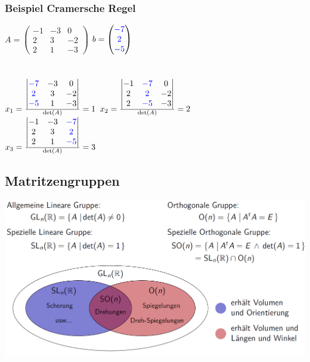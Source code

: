 			\vfill\null
			\columnbreak
			
			
			
			
			\subsubsection{Beispiel Cramersche Regel}
			$A = \begin{pmatrix}
				-1 & -3 & 0 \\
				2 & 3 & -2 \\
				2 & 1 & -3
				\end{pmatrix}$ \qquad $b = \begin{pmatrix}											\color{blue}-7 \\ \color{blue}2 \\ \color{blue}-5	
											\end{pmatrix}$ \\
				\\		
				\\ $x_1 = \frac{\begin{vmatrix}
							\color{blue}-7 & -3 & 0 \\
							\color{blue}2 & 3 & -2 \\
							\color{blue}-5 & 1 & -3 \\
							\end{vmatrix}}{\det(A)} = 1$ \qquad  $x_2 = \frac{\begin{vmatrix}
							-1 & \color{blue}-7 & 0 \\
							2 & \color{blue}2 & -2 \\
							2 & \color{blue}-5 & -3 \\
							\end{vmatrix}}{\det(A)} = 2$ \\
							
							\vspace{0.2cm}
				$x_3 = \frac{\begin{vmatrix}
							-1 & -3 & \color{blue}-7 \\
							2 & 3 & \color{blue}2 \\
							2 & 1 & \color{blue}-5 \\
							\end{vmatrix}}{\det(A)} = 3$ \\			
		    
		    
			\subsection{Matritzengruppen}	
			 \includegraphics[width=0.8\linewidth]{Bilder/matritzengruppen} \\
		    
